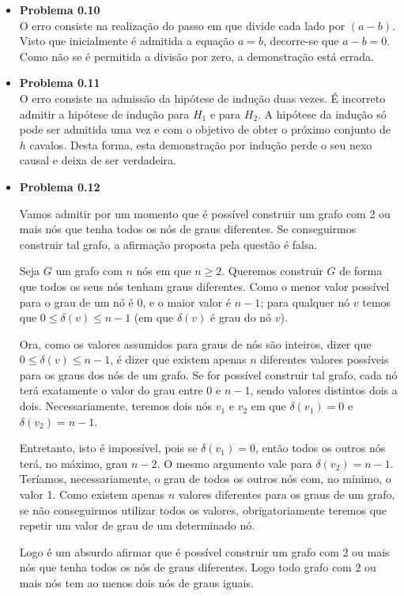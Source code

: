 \documentclass[12pt,a4paper,oneside]{article}
\begin{document}
\begin{itemize}

	\item {\bf Problema 0.10} \\
	{\color{verde} O erro consiste na realização do passo em que divide cada lado por $(a-b)$. Visto que inicialmente é admitida a equação $a=b$, decorre-se que $a-b=0$. Como não se é permitida a divisão por zero, a demonstração está errada.
	}
	
	\item {\bf Problema 0.11} \\
	{\color{verde} O erro consiste na admissão da hipótese de indução duas vezes. É incorreto admitir a hipótese de indução para $H_1$ e para $H_2$. A hipótese da indução só pode ser admitida uma vez e com o objetivo de obter o próximo conjunto de $h$ cavalos. Desta forma, esta demonstração por indução perde o seu nexo causal e deixa de ser verdadeira.
	}
	
	\item {\bf Problema 0.12} \\
	{\color{verde} Vamos admitir por um momento que é possível construir um grafo com 2 ou mais nós que tenha todos os nós de graus diferentes. Se conseguirmos construir tal grafo, a afirmação proposta pela questão é falsa.
	
	Seja $G$ um grafo com $n$ nós em que $n \geq 2$. Queremos construir $G$ de forma que todos os seus nós tenham graus diferentes. Como o menor valor possível para o grau de um nó é 0, e o maior valor é $n-1$; para qualquer nó $v$ temos que $0 \leq \delta(v) \leq n-1$ (em que $\delta(v)$ é grau do nó $v$).
	
	Ora, como os valores assumidos para graus de nós são inteiros, dizer que $0 \leq \delta(v) \leq n-1$, é dizer que existem apenas $n$ diferentes valores possíveis para os graus dos nós de um grafo. Se for possível construir tal grafo, cada nó terá exatamente o valor do grau entre 0 e $n-1$, sendo valores distintos dois a dois. Necessariamente, teremos dois nós $v_1$ e $v_2$ em que $\delta(v_1) = 0$ e $\delta(v_2) = n-1$. 
	
	Entretanto, isto é impossível, pois se $\delta(v_1) = 0$, então todos os outros nós terá, no máximo, grau $n-2$. O mesmo argumento vale para $\delta(v_2) = n-1$. Teríamos, necessariamente, o grau de todos os outros nós com, no mínimo, o valor 1. Como existem apenas $n$ valores diferentes para os graus de um grafo, se não conseguirmos utilizar todos os valores, obrigatoriamente teremos que repetir um valor de grau de um determinado nó.
	
	Logo é um absurdo afirmar que é possível construir um grafo com 2 ou mais nós que tenha todos os nós de graus diferentes. Logo todo grafo com 2 ou mais nós tem ao menos dois nós de graus iguais.
	
	}

\end{itemize}
\end{document}
